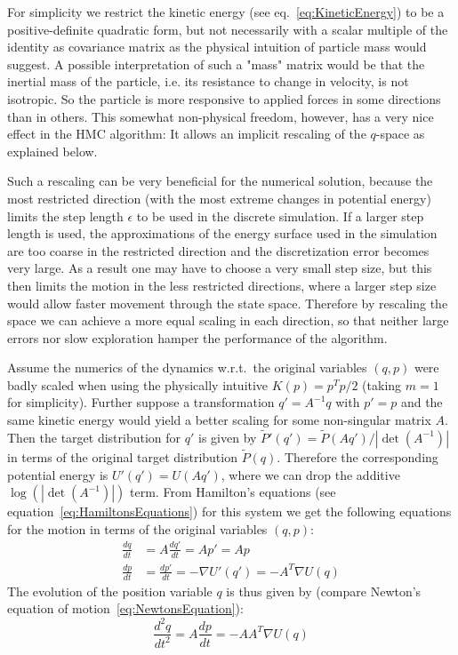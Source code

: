 For simplicity we restrict the kinetic energy (see eq.~\eqref{eq:KineticEnergy}) to be a positive-definite quadratic form, but not necessarily with a scalar multiple of the identity as covariance matrix as the physical intuition of particle mass would suggest. A possible interpretation of such a "mass" matrix would be that the inertial mass of the particle, i.e. its resistance to change in velocity, is not isotropic. So the particle is more responsive to applied forces in some directions than in others. This somewhat non-physical freedom, however, has a very nice effect in the HMC algorithm: It allows an implicit rescaling of the $q$-space as explained below.

Such a rescaling can be very beneficial for the numerical solution, because the most restricted direction (with the most extreme changes in potential energy) limits the step length $\epsilon$ to be used in the discrete simulation. If a larger step length is used, the approximations of the energy surface used in the simulation are too coarse in the restricted direction and the discretization error becomes very large. As a result one may have to choose a very small step size, but this then limits the motion in the less restricted directions, where a larger step size would allow faster movement through the state space. Therefore by rescaling the space we can achieve a more equal scaling in each direction, so that neither large errors nor slow exploration hamper the performance of the algorithm.

Assume the numerics of the dynamics w.r.t.\ the original variables $(q, p)$ were badly scaled when using the physically intuitive $K(p) = p^T p/2$ (taking $m=1$ for simplicity). Further suppose a transformation $q' = A^{-1} q$ with $p'=p$ and the same kinetic energy would yield a better scaling for some non-singular matrix $A$. Then the target distribution for $q'$ is given by $\tilde{P}'(q') = \tilde{P}(Aq')/|\det(A^{-1})|$ in terms of the original target distribution $\tilde{P}(q)$. Therefore the corresponding potential energy is $U'(q') = U(Aq')$, where we can drop the additive $\log(|\det(A^{-1})|)$ term. From Hamilton's equations (see equation~\eqref{eq:HamiltonsEquations}) for this system we get the following equations for the motion in terms of the original variables $(q, p)$:
\begin{equation}
\begin{split}
\frac{dq}{dt} &= A \frac{dq'}{dt} = Ap' = Ap \\
\frac{dp}{dt} &= \frac{dp'}{dt} = - \nabla U'(q') = - A^T \nabla U(q)
\end{split}
\end{equation}
The evolution of the position variable $q$ is thus given by (compare Newton's equation of motion~\eqref{eq:NewtonsEquation}):
\begin{equation} \label{eq:EvolutionQTransformed}
\frac{d^2q}{dt^2} = A \frac{dp}{dt} = - A A^T \nabla U(q)
\end{equation}

